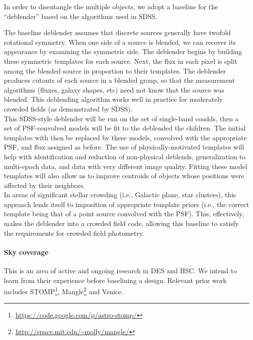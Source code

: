 \documentclass[12pt]{article}
\begin{document}
In order to disentangle the multiple objects, we adopt a baseline for the ``deblender'' based on the algorithms used in SDSS.

The baseline deblender assumes that discrete sources generally have twofold
rotational symmetry.  When one side of a source is blended, we can
recover its appearance by examining the symmetric side.  The deblender
begins by building these symmetric templates for each source.  Next,
the flux in each pixel is split among the blended source in proportion
to their templates.  The deblender produces cutouts of each
source in a blended group, so that the measurement algorithms (fluxes,
galaxy shapes, etc) need not know that the source was blended. This deblending algorithm works well in practice for moderately crowded fields (as demonstrated by SDSS).
\\

This SDSS-style deblender will be run on the set of single-band coadds, then a set of PSF-convolved models will be fit to the deblended the children. The initial templates with then be replaced by these models, convolved with the appropriate PSF, and flux assigned as before. The use of physically-motivated templates will help with identification and reduction of non-physical deblends, generalization to multi-epoch data, and data with very different image quality.  Fitting these model templates will also allow us to improve centroids of objects whose positions were affected by their neighbors. %
\\

In areas of significant stellar crowding (i.e., Galactic plane, star clusters), this approach lends itself to imposition of appropriate template priors (i.e., the correct template being that of a point source convolved with the PSF). This, effectively, makes the deblender into a crowded field code, allowing this baseline to satisfy the requirements for crowded field photometry.

\paragraph{Sky coverage}

This is an area of active and ongoing research in DES and HSC\@. We intend to learn from their experience before baselining a design. Relevant prior work includes STOMP\footnote{\url{https://code.google.com/p/astro-stomp/}}, Mangle\footnote{\url{http://space.mit.edu/~molly/mangle/}} and Venice.
\end{document}
